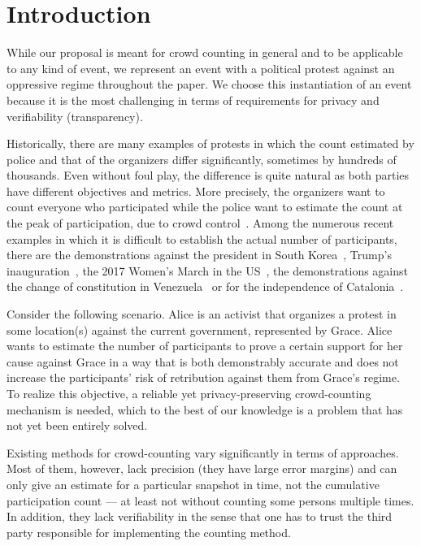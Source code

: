 \section{Introduction}%
\label{Introduction}


While our proposal is meant for crowd counting in general and to be applicable to any kind of event, we represent an event with a political protest against an oppressive regime throughout the paper. We choose this instantiation of an event because it is the most challenging in terms of requirements for privacy and verifiability (transparency).

Historically, there are many examples of protests in which the count estimated by police and that of the organizers differ significantly, sometimes by hundreds of thousands.
Even without foul play, the difference is quite natural as both parties have different objectives and metrics.
More precisely, the organizers want to count everyone who participated while the police want to estimate the count at the peak of participation, due to crowd control~\cite{2016DemonstrationsInSeoul}.
Among the numerous recent examples in which it is difficult to establish the actual number of participants, there are the demonstrations against the president in South Korea~\cite{2016DemonstrationsInSeoul}, Trump's inauguration~\cite{HowWillWeKnowTrumpInauguralCrowdSize}, the 2017 Women's March in the US~\cite{2017WomensMarchesInUS}, the demonstrations against the change of constitution in Venezuela~\cite{AlJazeeraOnVenezuela2017} or for the independence of Catalonia~\cite{CataloniaDemonstrations}.

Consider the following scenario.
Alice is an activist that organizes a protest in some location(s) against the current government, represented by Grace.
Alice wants to estimate the number of participants to prove a certain support for her cause against Grace in a way that is both demonstrably accurate and does not increase the participants' risk of retribution against them from Grace's regime. 
To realize this objective, a reliable yet privacy-preserving crowd-counting mechanism is needed, which to the best of our knowledge is a problem that has not yet been entirely solved.



Existing methods for crowd-counting vary significantly in terms of approaches.
Most of them, however, lack precision (\ie they have large error margins) and can only give an estimate for a particular snapshot in time, not the cumulative participation count --- at least not without counting some persons multiple times.  In addition, they lack verifiability in the sense that one has to trust the third party responsible for implementing the counting method.

